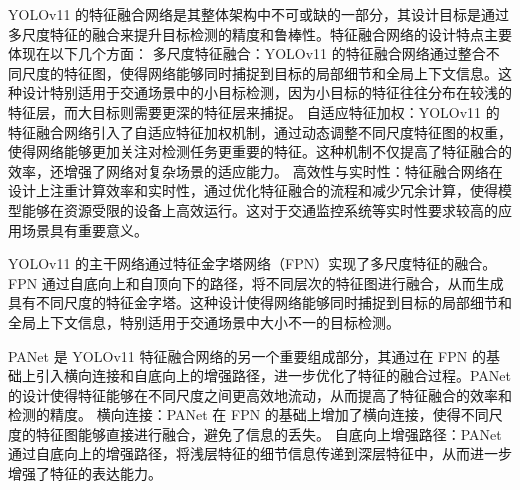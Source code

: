 YOLOv11 的特征融合网络是其整体架构中不可或缺的一部分，其设计目标是通过多尺度特征的融合来提升目标检测的精度和鲁棒性。特征融合网络的设计特点主要体现在以下几个方面：
多尺度特征融合：YOLOv11 的特征融合网络通过整合不同尺度的特征图，使得网络能够同时捕捉到目标的局部细节和全局上下文信息。这种设计特别适用于交通场景中的小目标检测，因为小目标的特征往往分布在较浅的特征层，而大目标则需要更深的特征层来捕捉。
自适应特征加权：YOLOv11 的特征融合网络引入了自适应特征加权机制，通过动态调整不同尺度特征图的权重，使得网络能够更加关注对检测任务更重要的特征。这种机制不仅提高了特征融合的效率，还增强了网络对复杂场景的适应能力。
高效性与实时性：特征融合网络在设计上注重计算效率和实时性，通过优化特征融合的流程和减少冗余计算，使得模型能够在资源受限的设备上高效运行。这对于交通监控系统等实时性要求较高的应用场景具有重要意义。

YOLOv11 的主干网络通过特征金字塔网络（FPN）实现了多尺度特征的融合。FPN 通过自底向上和自顶向下的路径，将不同层次的特征图进行融合，从而生成具有不同尺度的特征金字塔。这种设计使得网络能够同时捕捉到目标的局部细节和全局上下文信息，特别适用于交通场景中大小不一的目标检测。
\begin{figure}[htb]
    \centering
    \captionsetup{font=footnotesize}
    \label{fig:sppf}
\end{figure}

PANet 是 YOLOv11 特征融合网络的另一个重要组成部分，其通过在 FPN 的基础上引入横向连接和自底向上的增强路径，进一步优化了特征的融合过程。PANet 的设计使得特征能够在不同尺度之间更高效地流动，从而提高了特征融合的效率和检测的精度。
横向连接：PANet 在 FPN 的基础上增加了横向连接，使得不同尺度的特征图能够直接进行融合，避免了信息的丢失。
自底向上增强路径：PANet 通过自底向上的增强路径，将浅层特征的细节信息传递到深层特征中，从而进一步增强了特征的表达能力。
\begin{figure}[htb]
    \centering
    \captionsetup{font=footnotesize}
    \label{fig:YOLOv11_Neck}
\end{figure}

